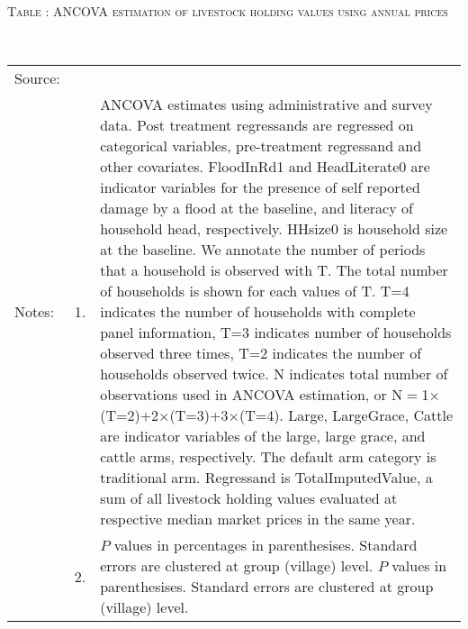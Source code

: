\hspace{-1cm}\begin{minipage}[t]{14cm}
\hfil\textsc{\normalsize Table \thetable: ANCOVA estimation of livestock holding values using annual prices\label{tab ANCOVA livestock annual price}}\\
\setlength{\tabcolsep}{1pt}
\setlength{\baselineskip}{8pt}
\renewcommand{\arraystretch}{.55}
\hfil{}\\
\renewcommand{\arraystretch}{.8}
\setlength{\tabcolsep}{1pt}
\begin{tabular}{>{\hfill\scriptsize}p{1cm}<{}>{\hfill\scriptsize}p{.25cm}<{}>{\scriptsize}p{12cm}<{\hfill}}
Source:& \multicolumn{2}{l}{\scriptsize Estimated with GUK administrative and survey data.}\\
Notes: & 1. & ANCOVA estimates using administrative and survey data. Post treatment regressands are regressed on categorical variables, pre-treatment regressand and other covariates. \textsf{FloodInRd1} and \textsf{HeadLiterate0} are indicator variables for the presence of self reported damage by a flood at the baseline, and literacy of household head, respectively. \textsf{HHsize0} is household size at the baseline. We annotate the number of periods that a household is observed with \textsf{T}. The total number of households is shown for each values of \textsf{T}. \textsf{T=4} indicates the number of households with complete panel information, \textsf{T=3} indicates number of households observed three times, \textsf{T=2} indicates the number of households observed twice. \textsf{N} indicates total number of observations used in ANCOVA estimation, or \textsf{N$=$1$\times$(T=2)+2$\times$(T=3)+3$\times$(T=4)}.  \textsf{Large}, \textsf{LargeGrace}, \textsf{Cattle} are indicator variables of the \textsf{large}, \textsf{large grace}, and \textsf{cattle} arms, respectively. The default arm category is \textsf{traditional} arm. Regressand is \textsf{TotalImputedValue}, a sum of all livestock holding values evaluated at respective median market prices in the same year. \\
& 2. & $P$ values in percentages in parenthesises. Standard errors are clustered at group (village) level.%
$P$ values in parenthesises. Standard errors are clustered at group (village) level.
\end{tabular}
\end{minipage}

